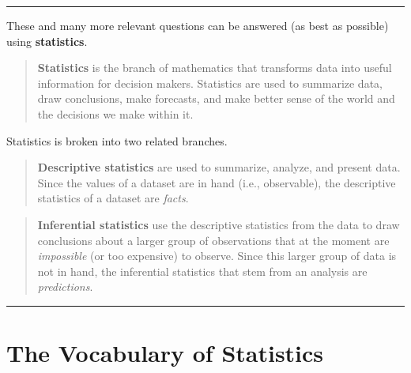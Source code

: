 \documentclass[
]{book}
\begin{document}
\begin{center}\rule{0.5\linewidth}{0.5pt}\end{center}

These and many more relevant questions can be answered (as best as possible) using \textbf{statistics}.

\begin{quote}
\textbf{Statistics} is the branch of mathematics that transforms data into useful information for decision makers. Statistics are used to summarize data, draw conclusions, make forecasts, and make better sense of the world and the decisions we make within it.
\end{quote}

Statistics is broken into two related branches.

\begin{quote}
\textbf{Descriptive statistics} are used to summarize, analyze, and present data. Since the values of a dataset are in hand (i.e., observable), the descriptive statistics of a dataset are \emph{facts}.
\end{quote}

\begin{quote}
\textbf{Inferential statistics} use the descriptive statistics from the data to draw conclusions about a larger group of observations that at the moment are \emph{impossible} (or too expensive) to observe. Since this larger group of data is not in hand, the inferential statistics that stem from an analysis are \emph{predictions}.
\end{quote}

\begin{center}\rule{0.5\linewidth}{0.5pt}\end{center}

\hypertarget{the-vocabulary-of-statistics}{%
\section{The Vocabulary of Statistics}\label{the-vocabulary-of-statistics}}
\end{document}
